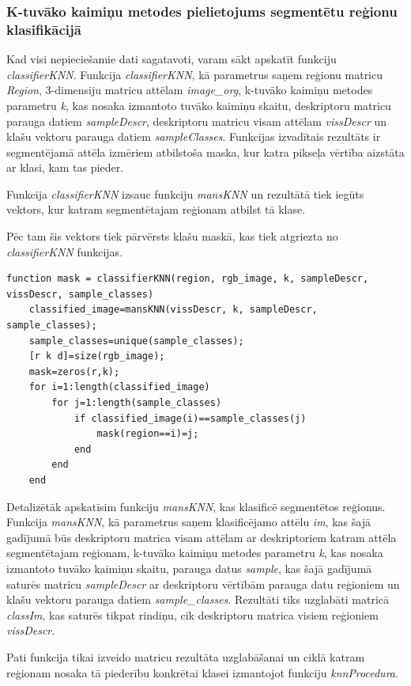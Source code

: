 \documentclass[12pt,paper=a4]{report}
\begin{document}
\subsubsection{K-tuvāko kaimiņu metodes pielietojums segmentētu reģionu klasifikācijā}
Kad visi nepieciešamie dati sagatavoti, varam sākt apskatīt funkciju \textit{classifierKNN}. Funkcija \textit{classifierKNN}, kā parametrus saņem reģionu matricu \textit{Region}, 3-dimensiju matricu attēlam \textit{image_org}, k-tuvāko kaimiņu metodes parametru \textit{k}, kas nosaka izmantoto tuvāko kaimiņu skaitu, deskriptoru matricu parauga datiem \textit{sampleDescr}, deskriptoru matricu visam attēlam \textit{vissDescr} un klašu vektoru parauga datiem \textit{sampleClasses}. Funkcijas izvadītais rezultāts ir segmentējamā attēla izmēriem atbilstoša maska, kur katra pikseļa vērtība aizstāta ar klasi, kam tas pieder. \par
Funkcija \textit{classifierKNN} izsauc funkciju \textit{mansKNN} un rezultātā tiek iegūts vektors, kur katram segmentētajam reģionam atbilst tā klase. \par
Pēc tam šis vektors tiek pārvērsts klašu maskā, kas tiek atgriezta no \textit{classifierKNN} funkcijas.
\begin{lstlisting}
function mask = classifierKNN(region, rgb_image, k, sampleDescr, vissDescr, sample_classes)
	classified_image=mansKNN(vissDescr, k, sampleDescr, sample_classes);
	sample_classes=unique(sample_classes);
	[r k d]=size(rgb_image);
	mask=zeros(r,k);
	for i=1:length(classified_image)
		for j=1:length(sample_classes)
			if classified_image(i)==sample_classes(j)
				mask(region==i)=j;
			end
		end
	end
\end{lstlisting}\par
Detalizētāk apskatīsim funkciju \textit{mansKNN}, kas klasificē segmentētos reģionus. Funkcija \textit{mansKNN}, kā parametrus saņem klasificējamo attēlu \textit{im}, kas šajā gadījumā būs deskriptoru matrica visam attēlam ar deskriptoriem katram attēla segmentētajam reģionam, k-tuvāko kaimiņu metodes parametru \textit{k}, kas nosaka izmantoto tuvāko kaimiņu skaitu, parauga datus \textit{sample}, kas šajā gadījumā saturēs matricu \textit{sampleDescr} ar deskriptoru vērtībām parauga datu reģioniem un klašu vektoru parauga datiem \textit{sample_classes}. Rezultāti tiks uzglabāti matricā \textit{classIm}, kas saturēs tikpat rindiņu, cik deskriptoru matrica visiem reģioniem \textit{vissDescr}.\par
Pati funkcija tikai izveido matricu rezultāta uzglabāšanai un ciklā katram reģionam nosaka tā piederību konkrētai klasei izmantojot funkciju \textit{knnProcedura}.
\end{document}
